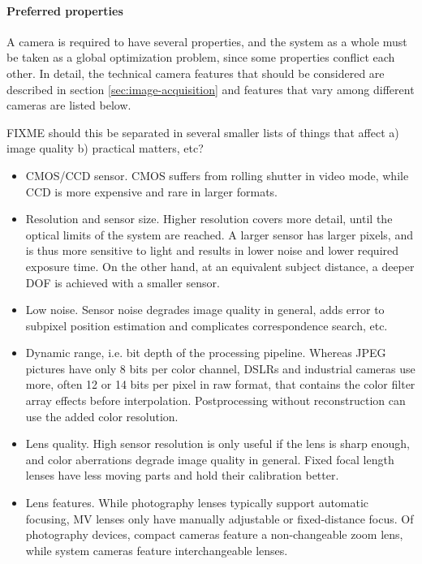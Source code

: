 \paragraph{Preferred properties}
A camera is required to have several properties, and the system as a whole must be taken as a global optimization problem, since some properties conflict each other.
In detail, the technical camera features that should be considered are described in section \ref{sec:image-acquisition} and features that vary among different cameras are listed below.

{\color{red} FIXME should this be separated in several smaller lists of things that affect a) image quality b) practical matters, etc? }

\begin{itemize}
	\item CMOS/CCD sensor. CMOS suffers from rolling shutter in video mode, while CCD is more expensive and rare in larger formats.

	\item Resolution and sensor size. Higher resolution covers more detail, until the optical limits of the system are reached. A larger sensor has larger pixels, and is thus more sensitive to light and results in lower noise and lower required exposure time. On the other hand, at an equivalent subject distance, a deeper DOF is achieved with a smaller sensor.

	\item Low noise. Sensor noise degrades image quality in general, adds error to subpixel position estimation and complicates correspondence search, etc.

	\item Dynamic range, i.e. bit depth of the processing pipeline. Whereas JPEG pictures have only 8 bits per color channel, DSLRs and industrial cameras use more, often 12 or 14 bits per pixel in raw format, that contains the color filter array effects before interpolation. Postprocessing without reconstruction can use the added color resolution.

	\item Lens quality. High sensor resolution is only useful if the lens is sharp enough, and color aberrations degrade image quality in general. Fixed focal length lenses have less moving parts and hold their calibration better.

	\item Lens features. While photography lenses typically support automatic focusing, MV lenses only have manually adjustable or fixed-distance focus. Of photography devices, compact cameras feature a non-changeable zoom lens, while system cameras feature interchangeable lenses.


\end{itemize}
